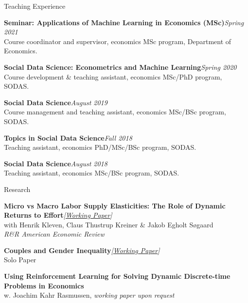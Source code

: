 \documentclass[
	11pt, %
]{resume} %
\begin{document}
\begin{rSection}{Teaching Experience}

    \textbf{Seminar: Applications of Machine Learning in Economics (MSc)}\hfill \textit{Spring 2021} \\
    Course coordinator and supervisor, economics MSc program, Department of Economics.

    \textbf{Social Data Science: Econometrics and Machine Learning}\hfill \textit{Spring 2020} \\
    Course development \& teaching assistant, economics MSc/PhD program, SODAS.

    \textbf{Social Data Science}\hfill \textit{August 2019} \\
    Course management and teaching assistant, economics MSc/BSc program, SODAS.

    \textbf{Topics in Social Data Science}\hfill \textit{Fall 2018} \\
    Teaching assistant, economics PhD/MSc/BSc program, SODAS.

    \textbf{Social Data Science}\hfill \textit{August 2018} \\
    Teaching assistant, economics MSc/BSc program, SODAS.

\end{rSection}

\newpage

\begin{rSection}{Research}

    \textbf{Micro vs Macro Labor Supply Elasticities: The Role of Dynamic Returns to Effort}\hfill \textit{[\href{https://www.nber.org/papers/w31549}{Working Paper}]} \\
    with Henrik Kleven, Claus Thustrup Kreiner \& Jakob Egholt Søgaard \\
    \textit{R\&R American Economic Review}

    \textbf{Couples and Gender Inequality}\hfill \textit{[\href{https://ssrn.com/abstract=4697847}{Working Paper}]} \\
    Solo Paper

    \textbf{Using Reinforcement Learning for Solving Dynamic Discrete-time Problems in Economics} \\
    w. Joachim Kahr Rasmussen, \textit{working paper upon request}
\end{rSection}
\end{document}
